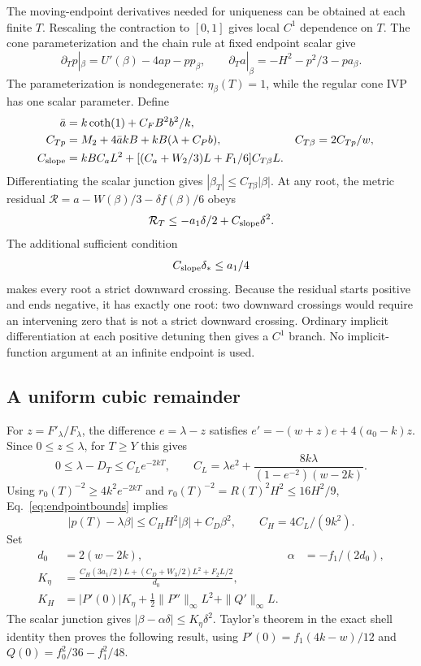 \documentclass[11pt]{article}
\begin{document}
The moving-endpoint derivatives needed for uniqueness can be obtained at each finite $T$. Rescaling the contraction to $[0,1]$ gives local $C^1$ dependence on $T$. The cone parameterization and the chain rule at fixed endpoint scalar give
\begin{equation}
\partial_Tp|_\beta=U'(\beta)-4ap-pp_\beta,\qquad
\partial_Ta|_\beta=-H^2-p^2/3-pa_\beta.
\end{equation}
The parameterization is nondegenerate: $\eta_\beta(T)=1$, while the regular cone IVP has one scalar parameter. Define
\begin{align}
\bar a&=k\coth(1)+C_FB^2b^2/k,\nonumber\\
C_{Tp}&=M_2+4\bar a kB+kB(\lambda+C_Pb),&C_{T\beta}&=2C_{Tp}/w,\nonumber\\
C_{\rm slope}&=kBC_aL^2+[(C_a+W_2/3)L+F_1/6]C_{T\beta}L.
\end{align}
Differentiating the scalar junction gives $|\beta_T|\le C_{T\beta}|\beta|$. At any root, the metric residual $\mathcal R=a-W(\beta)/3-\delta f(\beta)/6$ obeys
\begin{equation}
\mathcal R_T\le-a_1\delta/2+C_{\rm slope}\delta^2.
\end{equation}
The additional sufficient condition
\begin{equation}
C_{\rm slope}\delta_*\le a_1/4\label{eq:slopecondition}
\end{equation}
makes every root a strict downward crossing. Because the residual starts positive and ends negative, it has exactly one root: two downward crossings would require an intervening zero that is not a strict downward crossing. Ordinary implicit differentiation at each positive detuning then gives a $C^1$ branch. No implicit-function argument at an infinite endpoint is used.

\subsection{A uniform cubic remainder}
For $z=F'_\lambda/F_\lambda$, the difference $e=\lambda-z$ satisfies
$e'=-(w+z)e+4(a_0-k)z$. Since $0\le z\le\lambda$, for $T\ge Y$ this gives
\begin{equation}
0\le\lambda-D_T\le C_Le^{-2kT},\qquad
C_L=\lambda e^2+\frac{8k\lambda}{(1-e^{-2})(w-2k)}.
\end{equation}
Using $r_0(T)^{-2}\ge4k^2e^{-2kT}$ and
$r_0(T)^{-2}=R(T)^2H^2\le16H^2/9$, Eq.~\eqref{eq:endpointbounds} implies
\begin{equation}
|p(T)-\lambda\beta|\le C_HH^2|\beta|+C_D\beta^2,\qquad C_H=4C_L/(9k^2).
\end{equation}
Set
\begin{align}
d_0&=2(w-2k),&\alpha&=-f_1/(2d_0),\nonumber\\
K_\eta&=\frac{C_H(3a_1/2)L+(C_D+W_3/2)L^2+F_2L/2}{d_0},\nonumber\\
K_H&=|P'(0)|K_\eta+\tfrac12\|P''\|_\infty L^2+\|Q'\|_\infty L.
\label{eq:uniformconstants}
\end{align}
The scalar junction gives $|\beta-\alpha\delta|\le K_\eta\delta^2$. Taylor's theorem in the exact shell identity then proves the following result, using $P'(0)=f_1(4k-w)/12$ and $Q(0)=f_0^2/36-f_1^2/48$.
\end{document}
